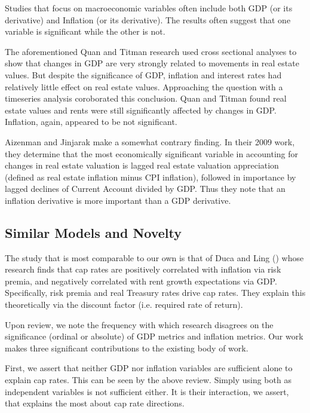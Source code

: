 \documentclass[jrfm,article,submit,oneauthor,pdftex]{Definitions/mdpi}
\begin{document}
Studies that focus on macroeconomic variables often include both GDP (or its derivative) and Inflation (or its derivative). The results often suggest that one variable is significant while the other is not. 

The aforementioned Quan and Titman research used cross sectional analyses to show that changes in GDP are very strongly related to movements in real estate values. But despite the significance of GDP, inflation and interest rates had relatively little effect on real estate values. Approaching the question with a timeseries analysis coroborated this conclusion. Quan and Titman found real estate values and rents were still significantly affected by changes in GDP. Inflation, again, appeared to be not significant. 

Aizenman and Jinjarak make a somewhat contrary finding. In their 2009 work, \citep*{aizenman2009current} they determine that the most economically significant variable in accounting for changes in real estate valuation is lagged real estate valuation appreciation (defined as real estate inflation minus CPI inflation), followed in importance by lagged declines of Current Account divided by GDP. Thus they note that an inflation derivative is more important than a GDP derivative. 

\subsection{Similar Models and Novelty}

The study that is most comparable to our own is that of Duca and Ling (\citeyear{duca2017taxes}) whose research finds that cap rates are positively correlated with inflation via risk premia, and negatively correlated with rent growth expectations via GDP. Specifically, risk premia and real Treasury rates drive cap rates. They explain this theoretically via the discount factor (i.e. required rate of return).

Upon review, we note the frequency with which research disagrees on the significance (ordinal or absolute) of GDP metrics and inflation metrics. Our work makes three significant contributions to the existing body of work. 

First, we assert that neither GDP nor inflation variables are sufficient alone to explain cap rates. This can be seen by the above review. Simply using both as independent variables is not sufficient either. It is their interaction, we assert, that explains the most about cap rate directions. 
\end{document}
